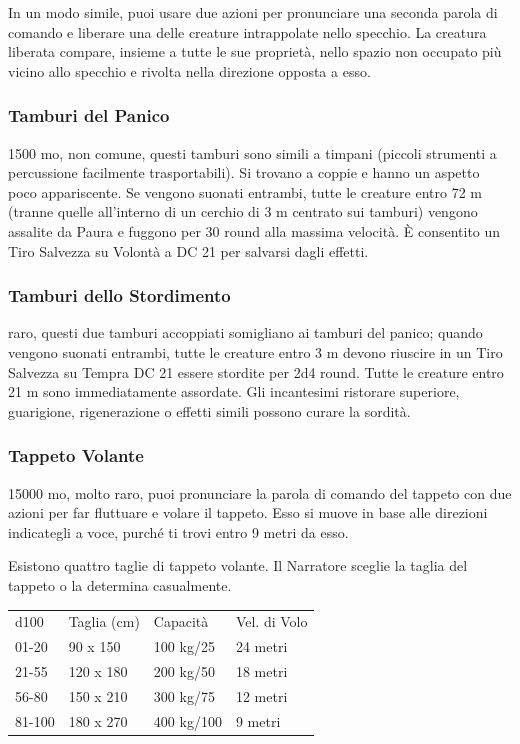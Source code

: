\begin{multicols}{2}
In un modo simile, puoi usare due azioni per pronunciare una seconda parola di comando e liberare una delle creature intrappolate nello specchio. La creatura liberata compare, insieme a tutte le sue proprietà, nello spazio non occupato più vicino allo specchio e rivolta nella direzione opposta a esso.

\subsubsection*{Tamburi del Panico}
1500 mo, non comune, questi tamburi sono simili a timpani (piccoli strumenti a percussione facilmente trasportabili). Si trovano a coppie e hanno un aspetto poco appariscente. Se vengono suonati entrambi, tutte le creature entro 72 m (tranne quelle all’interno di un cerchio di 3 m centrato sui tamburi) vengono assalite da Paura e fuggono per 30 round alla massima velocità. È consentito un Tiro Salvezza su Volontà a DC 21 per salvarsi dagli effetti.

\subsubsection*{Tamburi dello Stordimento}
raro, questi due tamburi accoppiati somigliano ai tamburi del panico; quando vengono suonati entrambi, tutte le creature entro 3 m devono riuscire in un Tiro Salvezza su Tempra DC 21 essere stordite per 2d4 round. Tutte le creature entro 21 m sono immediatamente assordate. Gli incantesimi ristorare superiore, guarigione, rigenerazione o effetti simili possono curare la sordità.

\subsubsection*{Tappeto Volante}
15000 mo, molto raro, puoi pronunciare la parola di comando del tappeto con due azioni per far fluttuare e volare il tappeto. Esso si muove in base alle direzioni indicategli a voce, purché ti trovi entro 9 metri da esso.

Esistono quattro taglie di tappeto volante. Il Narratore sceglie la taglia del tappeto o la determina casualmente.

\medskip

\begin{tabular}{llll}
d100 &Taglia (cm)&Capacità &Vel. di Volo\\
01-20& 90 x 150 &100 kg/25&24 metri\\
21-55& 120 x 180 &200 kg/50&18 metri\\
56-80& 150 x 210 &300 kg/75&12 metri\\
81-100& 180  x 270 & 400 kg/100& 9 metri\\
\end{tabular}


\end{multicols}
